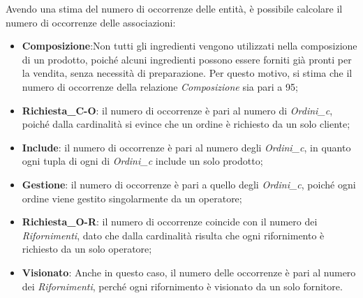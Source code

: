 \documentclass[12pt,a4paper]{article}
\begin{document}
    \vspace{8pt}
    \noindent
    Avendo una stima del numero di occorrenze delle entità, è possibile calcolare il numero di occorrenze delle associazioni:
    \begin{itemize}[leftmargin=1em]
        \item \textbf{Composizione}:Non tutti gli ingredienti vengono utilizzati nella composizione di un prodotto, poiché alcuni ingredienti possono essere forniti già pronti per la vendita, senza necessità di preparazione. Per questo motivo, si stima che il numero di occorrenze della relazione \textit{Composizione} sia pari a 95;
        \item  \textbf{Richiesta\_C-O}: il numero di occorrenze è pari al numero di \textit{Ordini\_c}, poiché dalla cardinalità si evince che un ordine è richiesto da un solo cliente;
        \item \textbf{Include}: il numero di occorrenze è pari al numero degli \textit{Ordini\_c}, in quanto ogni tupla di ogni  di \textit{Ordini\_c} include un solo prodotto;
        \item \textbf{Gestione}: il numero di occorrenze è pari a quello degli \textit{Ordini\_c}, poiché ogni ordine viene gestito singolarmente da un operatore;
        \item \textbf{Richiesta\_O-R}: il numero di occorrenze coincide con il numero dei \textit{Rifornimenti}, dato che dalla cardinalità risulta che ogni rifornimento è richiesto da un solo operatore;
        \item \textbf{Visionato}: Anche in questo caso, il numero delle occorrenze è pari al numero dei \textit{Rifornimenti},  perché ogni rifornimento è visionato da un solo fornitore.
    \end{itemize}
\end{document}
